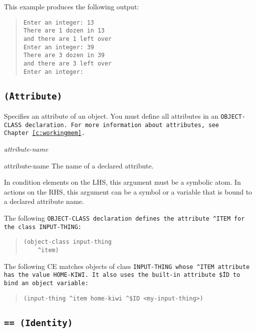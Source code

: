 This example produces the following output:

\begin{quote}
\begin{verbatim}
Enter an integer: 13
There are 1 dozen in 13
and there are 1 left over
Enter an integer: 39
There are 3 dozen in 39
and there are 3 left over
Enter an integer:
\end{verbatim}
\end{quote}

\subsection{\tt\^ (Attribute)}

Specifies an attribute of an object. You must define all attributes in
an \tt{OBJECT-CLASS} declaration. For more information about
attributes, see Chapter~\ref{c:workingmem}.

\Format

\ct\it{attribute-name}

\begin{arguments}
\item[attribute-name] The name of a declared attribute.

  In condition elements on the LHS, this argument must be a symbolic
  atom. In actions on the RHS, this argument can be a symbol or a
  variable that is bound to a declared attribute name.
\end{arguments}

\Example

The following \tt{OBJECT-CLASS} declaration defines the attribute
\tt{\^{}ITEM} for the class \tt{INPUT-THING}:

\begin{quote}
\begin{verbatim}
(object-class input-thing
    ^item)
\end{verbatim}
\end{quote}

The following CE matches objects of class \tt{INPUT-THING} whose
\tt{\^{}ITEM} attribute has the value \tt{HOME-KIWI}. It also uses the
built-in attribute \tt{\^\$ID} to bind an object variable:

\begin{quote}
\begin{verbatim}
(input-thing ^item home-kiwi ^$ID <my-input-thing>)
\end{verbatim}
\end{quote}

\subsection{\tt{==} (Identity)}

